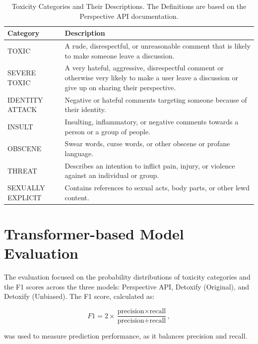 \begin{table}[tb]
    \centering\small
    \renewcommand{\arraystretch}{1.3}
    \begin{tabularx}{\textwidth}{lX}
        \toprule
        \textbf{Category} & \textbf{Description} \\
        \midrule
        TOXIC & A rude, disrespectful, or unreasonable comment that is likely to make someone leave a discussion. \\
        SEVERE TOXIC & A very hateful, aggressive, disrespectful comment or otherwise very likely to make a user leave a discussion or give up on sharing their perspective. \\
        IDENTITY ATTACK & Negative or hateful comments targeting someone because of their identity. \\
        INSULT & Insulting, inflammatory, or negative comments towards a person or a group of people. \\
        OBSCENE & Swear words, curse words, or other obscene or profane language. \\
        THREAT & Describes an intention to inflict pain, injury, or violence against an individual or group. \\
        SEXUALLY EXPLICIT & Contains references to sexual acts, body parts, or other lewd content. \\
        \bottomrule
    \end{tabularx}
    \caption[perspectiveapi]{Toxicity Categories and Their Descriptions. The Definitions are based on the Perspective API documentation\footnotemark.}
    \label{toxicity-categories}
\end{table}

\section{Transformer-based Model Evaluation} \label{evaluation}
The evaluation focused on the probability distributions of toxicity categories and the F1 scores across the three models: Perspective API, Detoxify (Original), and Detoxify (Unbiased). The F1 score, calculated as:

\[
F1 = 2 \times \frac{\text{precision} \times \text{recall}}{\text{precision} + \text{recall}},
\]

was used to measure prediction performance, as it balances precision and recall.


